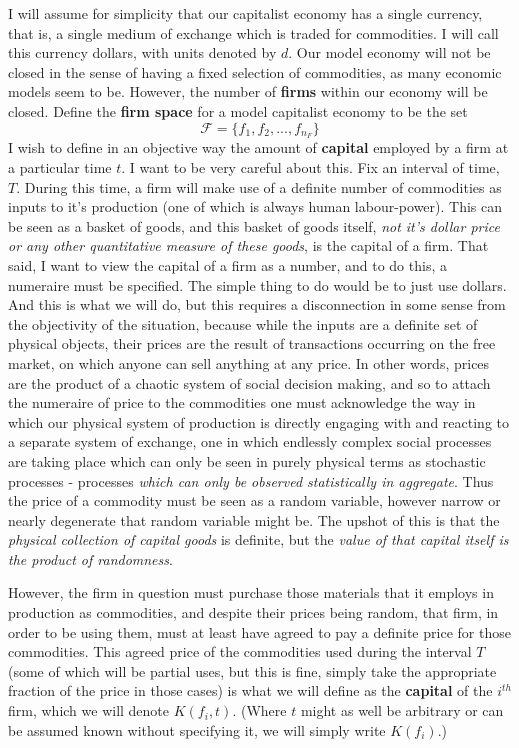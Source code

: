 I will assume for simplicity that our capitalist economy has a single currency, that is, a single medium of exchange which is traded for commodities. I will call this currency dollars, with units denoted by $d$. Our model economy will not be closed in the sense of having a fixed selection of commodities, as many economic models seem to be. However, the number of \textbf{firms} within our economy will be closed. Define the \textbf{firm space} for a model capitalist economy to be the set
	 \[ \mathcal{F} = \{ f_1,f_2,...,f_{n_F} \} \]
I wish to define in an objective way the amount of \textbf{capital} employed by a firm at a particular time $t$. I want to be very careful about this. Fix an interval of time, $T$. During this time, a firm will make use of a definite number of commodities as inputs to it's production (one of which is always human labour-power). This can be seen as a basket of goods, and this basket of goods itself, \textit{not it's dollar price or any other quantitative measure of these goods}, is the capital of a firm. That said, I want to view the capital of a firm as a number, and to do this, a numeraire must be specified. The simple thing to do would be to just use dollars. And this is what we will do, but this requires a disconnection in some sense from the objectivity of the situation, because while the inputs are a definite set of physical objects, their prices are the result of transactions occurring on the free market, on which anyone can sell anything at any price. In other words, prices are the product of a chaotic system of social decision making, and so to attach the numeraire of price to the commodities one must acknowledge the way in which our physical system of production is directly engaging with and reacting to a separate system of exchange, one in which endlessly complex social processes are taking place which can only be seen in purely physical terms as stochastic processes - processes \textit{which can only be observed statistically in aggregate}. Thus the price of a commodity must be seen as a random variable, however narrow or nearly degenerate that random variable might be. The upshot of this is that the \textit{physical collection of capital goods} is definite, but the \textit{value of that capital itself is the product of randomness}. 
\par 
However, the firm in question must purchase those materials that it employs in production as commodities, and despite their prices being random, that firm, in order to be using them, must at least have agreed to pay a definite price for those commodities. This agreed price of the commodities used during the interval $T$ (some of which will be partial uses, but this is fine, simply take the appropriate fraction of the price in those cases) is what we will define as the \textbf{capital} of the $i^{th}$ firm, which we will denote $K(f_i,t)$. (Where $t$ might as well be arbitrary or can be assumed known without specifying it, we will simply write  $K(f_i)$.) \par 

